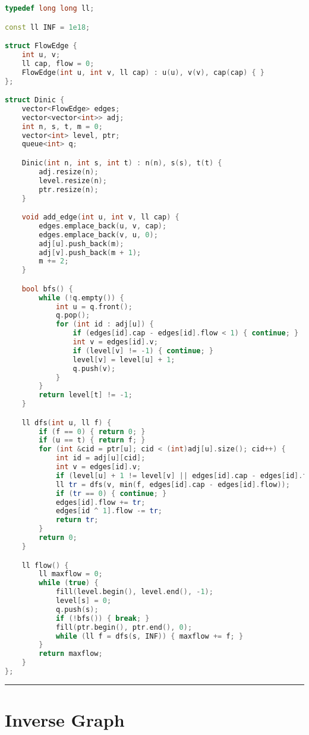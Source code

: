 \documentclass[11pt, a4paper, twoside]{book}
\begin{document}
\begin{lstlisting}[language=C++]
typedef long long ll;

const ll INF = 1e18;

struct FlowEdge {
    int u, v;
    ll cap, flow = 0;
    FlowEdge(int u, int v, ll cap) : u(u), v(v), cap(cap) { }
};

struct Dinic {
    vector<FlowEdge> edges;
    vector<vector<int>> adj;
    int n, s, t, m = 0;
    vector<int> level, ptr;
    queue<int> q;

    Dinic(int n, int s, int t) : n(n), s(s), t(t) {
        adj.resize(n);
        level.resize(n);
        ptr.resize(n);
    }

    void add_edge(int u, int v, ll cap) {
        edges.emplace_back(u, v, cap);
        edges.emplace_back(v, u, 0);
        adj[u].push_back(m);
        adj[v].push_back(m + 1);
        m += 2;
    }

    bool bfs() {
        while (!q.empty()) {
            int u = q.front();
            q.pop();
            for (int id : adj[u]) {
                if (edges[id].cap - edges[id].flow < 1) { continue; }
                int v = edges[id].v;
                if (level[v] != -1) { continue; }
                level[v] = level[u] + 1;
                q.push(v);
            }
        }
        return level[t] != -1;
    }

    ll dfs(int u, ll f) {
        if (f == 0) { return 0; }
        if (u == t) { return f; }
        for (int &cid = ptr[u]; cid < (int)adj[u].size(); cid++) {
            int id = adj[u][cid];
            int v = edges[id].v;
            if (level[u] + 1 != level[v] || edges[id].cap - edges[id].flow < 1) { continue; }
            ll tr = dfs(v, min(f, edges[id].cap - edges[id].flow));
            if (tr == 0) { continue; }
            edges[id].flow += tr;
            edges[id ^ 1].flow -= tr;
            return tr;
        }
        return 0;
    }

    ll flow() {
        ll maxflow = 0;
        while (true) {
            fill(level.begin(), level.end(), -1);
            level[s] = 0;
            q.push(s);
            if (!bfs()) { break; }
            fill(ptr.begin(), ptr.end(), 0);
            while (ll f = dfs(s, INF)) { maxflow += f; }
        }
        return maxflow;
    }
};
\end{lstlisting}

\hfill

\rule{\textwidth}{0.4pt}

\section{Inverse Graph}
\end{document}

